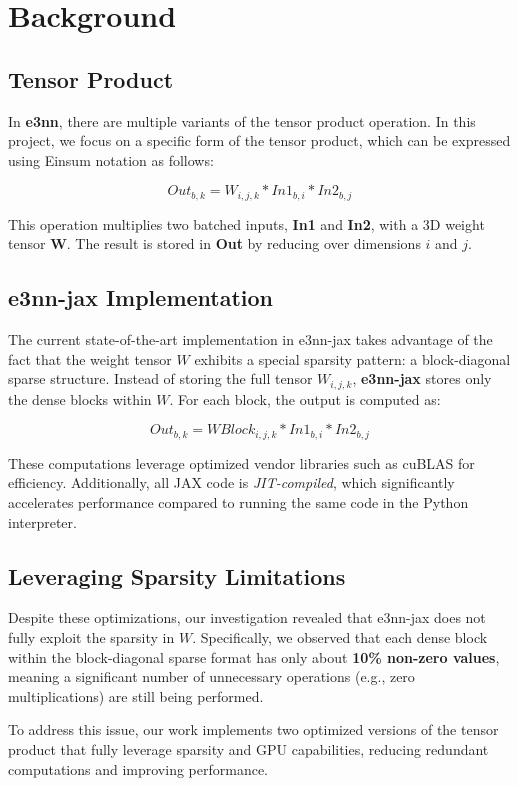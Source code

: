 \section{Background}
\label{sec:background}

\subsection{Tensor Product}

In \textbf{e3nn}, there are multiple variants of the tensor product operation. In this project, we focus on a specific form of the tensor product, which can be expressed using Einsum notation as follows:

\[
Out_{b,k} = W_{i,j,k} \ast In1_{b,i} \ast In2_{b,j}
\]

This operation multiplies two batched inputs, \textbf{In1} and \textbf{In2}, with a 3D weight tensor \textbf{W}. The result is stored in \textbf{Out} by reducing over dimensions \(i\) and \(j\).

\subsection{e3nn-jax Implementation}

The current state-of-the-art implementation in e3nn-jax takes advantage of the fact that the weight tensor \(W\) exhibits a special sparsity pattern: a block-diagonal sparse structure. Instead of storing the full tensor \(W_{i,j,k}\), \textbf{e3nn-jax} stores only the dense blocks within \(W\). For each block, the output is computed as:

\[
Out_{b,k} = WBlock_{i,j,k} \ast In1_{b,i} \ast In2_{b,j}
\]

These computations leverage optimized vendor libraries such as cuBLAS\cite{nvidia2021cublas} for efficiency. Additionally, all JAX code is \textit{JIT-compiled}, which significantly accelerates performance compared to running the same code in the Python interpreter.

\subsection{Leveraging Sparsity Limitations}

Despite these optimizations, our investigation revealed that e3nn-jax does not fully exploit the sparsity in \(W\). Specifically, we observed that each dense block within the block-diagonal sparse format has only about \textbf{10\% non-zero values}, meaning a significant number of unnecessary operations (e.g., zero multiplications) are still being performed.

To address this issue, our work implements two optimized versions of the tensor product that fully leverage sparsity and GPU capabilities, reducing redundant computations and improving performance.
